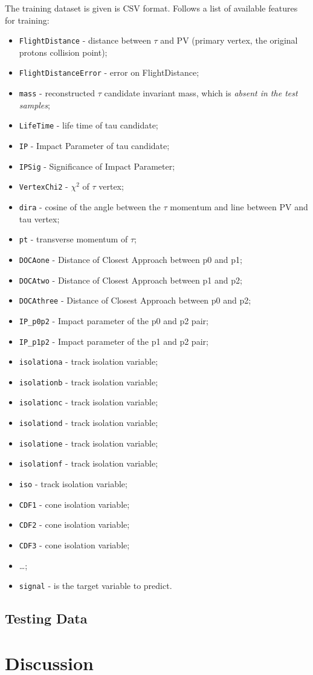 \documentclass[11pt]{article}
\begin{document}
The training dataset is given is CSV format. Follows a list of available
features for training:
\begin{itemize}
	\item \texttt{FlightDistance} - distance between $\tau$ and PV (primary vertex, the
		original protons collision point);
	\item \texttt{FlightDistanceError} - error on FlightDistance;
	\item \texttt{mass} - reconstructed $\tau$ candidate invariant mass, which
		is \textit{absent in the test samples};
	\item \texttt{LifeTime} - life time of tau candidate;
	\item \texttt{IP} - Impact Parameter of tau candidate;
	\item \texttt{IPSig} - Significance of Impact Parameter;
	\item \texttt{VertexChi2} - $\chi^2$ of $\tau$ vertex;
	\item \texttt{dira} - cosine of the angle between the $\tau$ momentum and line
		between PV and tau vertex;
	\item \texttt{pt} - transverse momentum of $\tau$;
	\item \texttt{DOCAone} - Distance of Closest Approach between p0 and p1;
	\item \texttt{DOCAtwo} - Distance of Closest Approach between p1 and p2;
	\item \texttt{DOCAthree} - Distance of Closest Approach between p0 and p2;
	\item \texttt{IP\_p0p2} - Impact parameter of the p0 and p2 pair;
	\item \texttt{IP\_p1p2} - Impact parameter of the p1 and p2 pair;
	\item \texttt{isolationa} - track isolation variable;
	\item \texttt{isolationb} - track isolation variable;
	\item \texttt{isolationc} - track isolation variable;
	\item \texttt{isolationd} - track isolation variable;
	\item \texttt{isolatione} - track isolation variable;
	\item \texttt{isolationf} - track isolation variable;
	\item \texttt{iso} - track isolation variable;
	\item \texttt{CDF1} - cone isolation variable;
	\item \texttt{CDF2} - cone isolation variable;
	\item \texttt{CDF3} - cone isolation variable;
	\item \dots; %
	\item \texttt{signal} - is the target variable to predict.
\end{itemize}

\subsection{Testing Data}


\section{Discussion}
\end{document}
